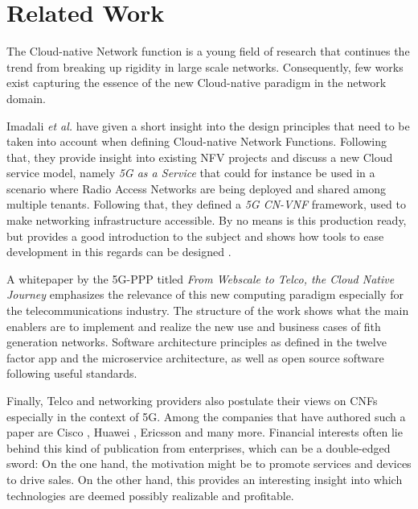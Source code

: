 \section{Related Work}
The Cloud-native Network function is a young field of research that continues the trend from breaking up rigidity in large scale networks. Consequently, few works exist capturing the essence of the new Cloud-native paradigm in the network domain.

Imadali \textit{et al.} have given a short insight into the design principles that need to be taken into account when defining Cloud-native Network Functions. Following that, they provide insight into existing NFV projects and discuss a new Cloud service model, namely \textit{5G as a Service} that could for instance be used in a scenario where Radio Access Networks are being deployed and shared among multiple tenants. Following that, they defined a \textit{5G CN-VNF} framework, used to make networking infrastructure accessible. By no means is this production ready, but provides a good introduction to the subject and shows how tools to ease development in this regards can be designed  \cite{cn5gvnf}.

A whitepaper by the 5G-PPP titled \textit{From Webscale to Telco, the Cloud Native Journey} \cite{5gppp} emphasizes the relevance of this new computing paradigm especially for the telecommunications industry. The structure of the work shows what the main enablers are to implement and realize the new use and business cases of fith generation networks. Software architecture principles as defined in the twelve factor app and the microservice architecture, as well as open source software following useful standards. 

Finally, Telco and networking providers also postulate their views on CNFs especially in the context of 5G. Among the companies that have authored such a paper are Cisco \cite{CNF}, Huawei \cite{evolutionnfv}, Ericsson \cite{ericsson} and many more. Financial interests often lie behind this kind of publication from enterprises, which can be a double-edged sword: On the one hand, the motivation might be to promote services and devices to drive sales. On the other hand, this provides an interesting insight into which technologies are deemed possibly realizable and profitable. 